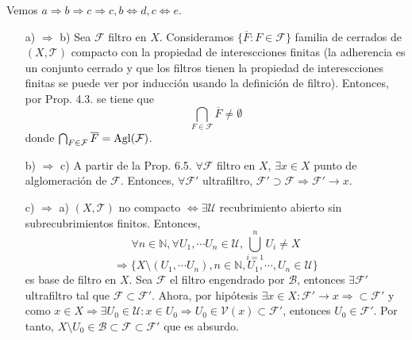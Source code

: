 \begin{dem}
  Vemos $a \Rightarrow b \Rightarrow c \Rightarrow c, b \Leftrightarrow d, c \Leftrightarrow e$.
  \begin{enumerate}[label=(\roman*)]
    \item []
    \item [a) $\Rightarrow$ b)] Sea $\mathcal{F}$ filtro en $X$. Consideramos $\{ \overline{F} : F \in \mathcal{F} \}$ familia de cerrados de $( X, \mathcal{T} )$ compacto con la propiedad de interescciones finitas (la adherencia es un conjunto cerrado y que los filtros tienen la propiedad de interescciones finitas se puede ver por inducción usando la definición de filtro). Entonces, por Prop. 4.3. se tiene que
      \[ 
        \bigcap_{F \in \mathcal{F}} \overline{F} \neq \emptyset 
      \] 
      donde $\bigcap_{F \in \mathcal{F}} \overline{F} = \operatorname{Agl}(\mathcal{F})$.

    \item [b) $\Rightarrow$ c)] A partir de la Prop. 6.5. $\forall \mathcal{F}$ filtro en $X$, $\exists x \in X$ punto de alglomeración de $\mathcal{F}$. Entonces, $\forall \mathcal{F}'$ ultrafiltro, $\mathcal{F}' \supset \mathcal{F} \Rightarrow \mathcal{F}' \rightarrow x$.
    \item [c) $\Rightarrow$ a)] $( X, \mathcal{T} )$ no compacto $\Leftrightarrow \exists \mathcal{U}$ recubrimiento abierto sin subrecubrimientos finitos. Entonces,
      \[
        \forall n \in \mathbb{N}, \forall U_{1}, \cdots U_{n} \in \mathcal{U}, \bigcup_{i = 1}^{n} U_{i} \neq X
      \]
      \[ 
        \Rightarrow \{ X \setminus (U_{1}, \cdots U_{n}), n \in \mathbb{N}, U_{1}, \cdots, U_{n} \in \mathcal{U}\} 
      \] 
      es base de filtro en $X$. Sea $\mathcal{F}$ el filtro engendrado por $\mathcal{B}$, entonces $\exists \mathcal{F}'$ ultrafiltro tal que $\mathcal{F} \subset \mathcal{F}'$. Ahora, por hipótesis $\exists x \in X: \mathcal{F}' \rightarrow x \Rightarrow \subset \mathcal{F}'$ y como $x \in X \Rightarrow \exists U_{0} \in \mathcal{U} : x \in U_{0} \Rightarrow U_{0} \in \mathcal{V}(x) \subset \mathcal{F}'$, entonces $U_{0} \in \mathcal{F}'$. Por tanto, $X \setminus U_{0} \in \mathcal{B} \subset \mathcal{F} \subset \mathcal{F}'$ que es absurdo.
      

\end{enumerate}
\end{dem}
